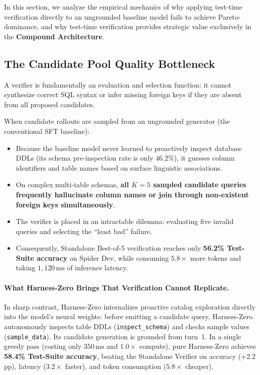 \documentclass{article}
\theoremstyle{plain}
\theoremstyle{definition}
\theoremstyle{remark}
\begin{document}
In this section, we analyze the empirical mechanics of why applying test-time verification directly to an ungrounded baseline model fails to achieve Pareto-dominance, and why test-time verification provides strategic value exclusively in the \textbf{Compound Architecture}.

\subsection{The Candidate Pool Quality Bottleneck}
A verifier is fundamentally an evaluation and selection function: it cannot synthesize correct SQL syntax or infer missing foreign keys if they are absent from all proposed candidates.

When candidate rollouts are sampled from an ungrounded generator (the conventional SFT baseline):
\begin{itemize}[leftmargin=*,itemsep=2pt]
    \item Because the baseline model never learned to proactively inspect database DDLs (its schema pre-inspection rate is only $46.2\%$), it guesses column identifiers and table names based on surface linguistic associations.
    \item On complex multi-table schemas, \textbf{all $K=5$ sampled candidate queries frequently hallucinate column names or join through non-existent foreign keys simultaneously}.
    \item The verifier is placed in an intractable dilemma: evaluating five invalid queries and selecting the ``least bad'' failure.
    \item Consequently, Standalone Best-of-5 verification reaches only \textbf{56.2\% Test-Suite accuracy} on Spider Dev, while consuming $5.8\times$ more tokens and taking $1{,}120\,\text{ms}$ of inference latency.
\end{itemize}

\paragraph{What Harness-Zero Brings That Verification Cannot Replicate.}
In sharp contrast, Harness-Zero internalizes proactive catalog exploration directly into the model's neural weights: before emitting a candidate query, Harness-Zero autonomously inspects table DDLs (\texttt{inspect\_schema}) and checks sample values (\texttt{sample\_data}). Its candidate generation is grounded from turn~1. In a single greedy pass (costing only $350\,\text{ms}$ and $1.0\times$ compute), pure Harness-Zero achieves \textbf{58.4\% Test-Suite accuracy}, beating the Standalone Verifier on accuracy (+2.2\,pp), latency ($3.2\times$ faster), and token consumption ($5.8\times$ cheaper).
\end{document}

